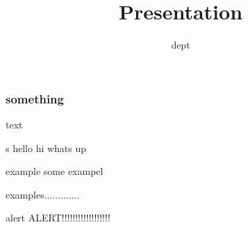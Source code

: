 \documentclass{beamer}
\title{Presentation}
\author{dept}
\begin{document}
	\frame{\titlepage}
	\begin{frame}
	\frametitle{something}
	text
	\end{frame}

	\begin{frame}s
	hello
	\alert{hi} whats up
	\begin{block}{example}
		some exampel
	\end{block}
	\begin{example}
		examples.............
	\end{example}
	\begin{alertblock}{alert}
		ALERT!!!!!!!!!!!!!!!!!!
	\end{alertblock}	
	\end{frame}
\end{document}
